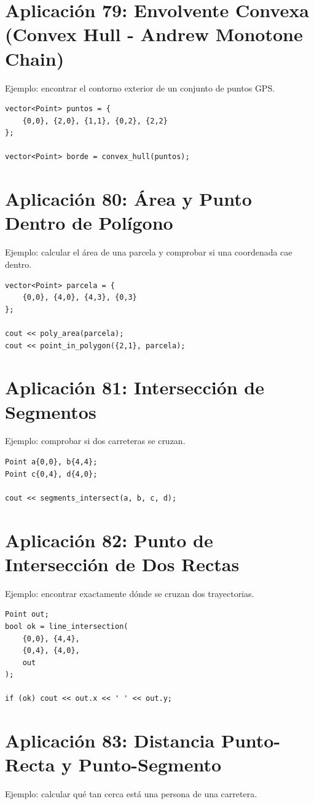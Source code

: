 \documentclass[10pt,twocolumn,letterpaper]{report}
\begin{document}
\section{Aplicación 79: Envolvente Convexa (Convex Hull - Andrew Monotone Chain)}
Ejemplo: encontrar el contorno exterior de un conjunto de puntos GPS.

\begin{lstlisting}
vector<Point> puntos = {
    {0,0}, {2,0}, {1,1}, {0,2}, {2,2}
};

vector<Point> borde = convex_hull(puntos);
\end{lstlisting}

\section{Aplicación 80: Área y Punto Dentro de Polígono}
Ejemplo: calcular el área de una parcela y comprobar si una coordenada cae dentro.

\begin{lstlisting}
vector<Point> parcela = {
    {0,0}, {4,0}, {4,3}, {0,3}
};

cout << poly_area(parcela);
cout << point_in_polygon({2,1}, parcela);
\end{lstlisting}

\section{Aplicación 81: Intersección de Segmentos}
Ejemplo: comprobar si dos carreteras se cruzan.

\begin{lstlisting}
Point a{0,0}, b{4,4};
Point c{0,4}, d{4,0};

cout << segments_intersect(a, b, c, d);
\end{lstlisting}

\section{Aplicación 82: Punto de Intersección de Dos Rectas}
Ejemplo: encontrar exactamente dónde se cruzan dos trayectorias.

\begin{lstlisting}
Point out;
bool ok = line_intersection(
    {0,0}, {4,4},
    {0,4}, {4,0},
    out
);

if (ok) cout << out.x << ' ' << out.y;
\end{lstlisting}

\section{Aplicación 83: Distancia Punto-Recta y Punto-Segmento}
Ejemplo: calcular qué tan cerca está una persona de una carretera.
\end{document}
